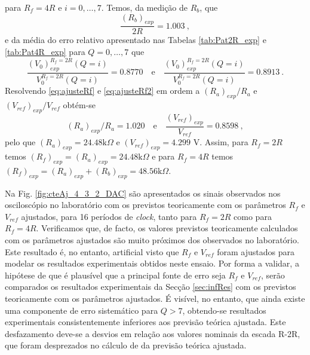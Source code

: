 \documentclass[a4paper, oneside]{article}
\begin{document}
para $R_f = 4R$ e $i = 0, \dots, 7$. Temos, da medição de $R_b$, que 
\begin{equation}\label{key}
\frac{(R_b)_{exp}}{2R} = 1.003\:,
\end{equation}
e da média do erro relativo apresentado nas Tabelas \ref{tab:Pat2R_exp} e \ref{tab:Pat4R_exp} para $Q = 0,\ldots,7$ que 
\begin{equation}\label{key}
\frac{(V_0)_{exp}^{R_f = 2R}(Q = i)}{V_0^{R_f = 2R}(Q = i)} = 0.8770 \quad \text{e} \quad \frac{(V_0)_{exp}^{R_f = 2R}(Q = i)}{V_0^{R_f = 2R}(Q = i)} = 0.8913\:.
\end{equation}
Resolvendo \eqref{eq:ajusteRf} e \eqref{eq:ajusteRf2} em ordem a $(R_a)_{exp}/R_a$ e $(V_{ref})_{exp}/V_{ref}$ obtém-se
\begin{equation}\label{key}
(R_a)_{exp}/R_a = 1.020 \quad \text{e} \quad  \frac{(V_{ref})_{exp}}{V_{ref}} = 0.8598\:,
\end{equation}
pelo que $(R_a)_{exp} = 24.48\text{k}\Omega$ e $(V_{ref})_{exp} = 4.299$ V. Assim, para $R_f = 2R$ temos $(R_f)_{exp} = (R_a)_{exp} = 24.48\text{k}\Omega$ e para $R_f = 4R$ temos $(R_f)_{exp} = (R_a)_{exp}+(R_b)_{exp} = 48.56\text{k}\Omega$.

Na Fig. \ref{fig:cteAj_4_3_2_DAC} são apresentados os sinais observados nos osciloscópio no laboratório com os previstos teoricamente com os parâmetros $R_f$ e $V_{ref}$ ajustados, para 16 períodos de \textit{clock}, tanto para $R_f = 2R$ como para $R_f = 4R$. Verificamos que, de facto, os valores previstos teoricamente calculados com os parâmetros ajustados são muito próximos dos observados no laboratório. Este resultado é, no entanto, artificial visto que $R_f$ e $V_{ref}$ foram ajustados para modelar os resultados experimentais obtidos neste ensaio. Por forma a validar, a hipótese de que é plausível que a principal fonte de erro seja $R_f$ e $V_{ref}$, serão comparados os resultados experimentais da Secção \ref{sec:infRes} com os previstos teoricamente com os parâmetros ajustados. É visível, no entanto, que ainda existe uma componente de erro sistemático para $Q>7$, obtendo-se resultados experimentais consistentemente inferiores aos previsão teórica ajustada. Este desfazamento deve-se a desvios em relação aos valores nominais da escada R-2R, que foram desprezados no cálculo de da previsão teórica ajustada.
\end{document}
